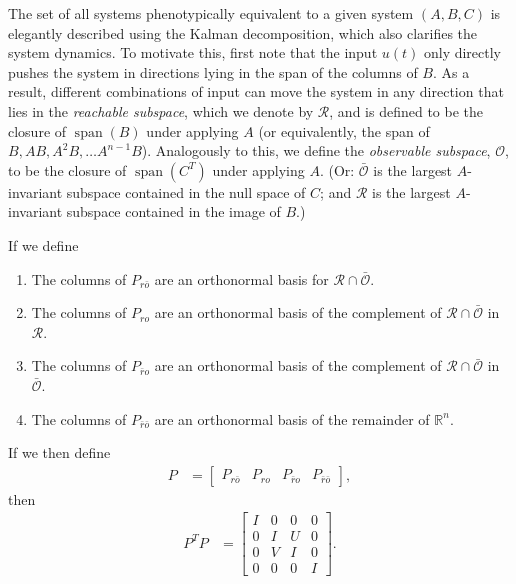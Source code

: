\documentclass{article}
\newcommand{\plr}[1]{\todo[color=blue!25]{#1}}
\newcommand{\plr}[1]{{\color{blue}\it #1}}
\newcommand{\ro}{{ro}}
\newcommand{\nro}{{\bar{r}o}}
\newcommand{\rno}{{r\bar{o}}}
\newcommand{\nrno}{{\bar{r}\bar{o}}}
\newcommand{\reachable}{\mathcal{R}}
\newcommand{\unobservable}{\bar{\mathcal{O}}}
\newcommand{\R}{\mathbb{R}}
\newcommand{\1}{\mathbbm{1}}
\DeclareMathOperator{\spn}{span}
\begin{document}
The set of all systems phenotypically equivalent to a given system $(A,B,C)$ 
is elegantly described using the Kalman decomposition,
which also clarifies the system dynamics.
To motivate this, first note that the input $u(t)$ only directly pushes the system
in directions lying in the span of the columns of $B$.
As a result, different combinations of input can 
move the system in any direction that lies in the \emph{reachable subspace},
which we denote by $\reachable$,
and is defined to be the closure of $\spn(B)$ under applying $A$
(or equivalently, the span of $B, AB, A^2B, \ldots A^{n-1}B$).
Analogously to this, we define
the \emph{observable subspace}, $\mathcal{O}$,
to be the closure of $\spn(C^T)$ under applying $A$.
(Or: $\unobservable$ is the largest $A$-invariant subspace
contained in the null space of $C$;
and $\reachable$ is the largest $A$-invariant subspace contained in the image of $B$.)

If we define
\begin{enumerate}
    \item The columns of $P_\rno$ are an orthonormal basis for $\reachable \cap \unobservable$.
    \item The columns of $P_\ro$ are an orthonormal basis of
        the complement of $\reachable \cap \unobservable$ in $\reachable$.
    \item The columns of $P_\nro$ are an orthonormal basis of
        the complement of $\reachable \cap \unobservable$ in $\unobservable$.
    \item The columns of $P_\nrno$ are an orthonormal basis of
        the remainder of $\R^n$.
\end{enumerate}
If we then define
\begin{align*}
    P &= 
    \left[ \begin{array}{c|c|c|c}
        P_\rno & P_\ro & P_\nro & P_\nrno
    \end{array} \right] ,
\end{align*}
then
\begin{align*}
    P^T P
    &=
    \left[ \begin{array}{c|c|c|c}
        I & 0 & 0 & 0 \\
        \hline
        0 & I & U & 0 \\
        \hline
        0 & V & I & 0 \\
        \hline
        0 & 0 & 0 & I 
    \end{array} \right] .
\end{align*}
\plr{Check this.  Can we get $U=V=0$?}
\end{document}
